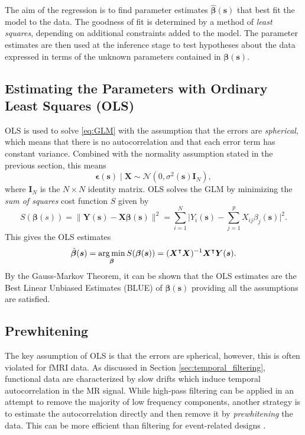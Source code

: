The aim of the regression is to find parameter estimates $\bm{\hat{\beta}}(\bm{s})$ that best fit the model to the data. The goodness of fit is determined by a method of \textit{least squares}, depending on additional constraints added to the model. The parameter estimates are then used at the inference stage to test hypotheses about the data expressed in terms of the unknown parameters contained in $\bm{\beta}(\bm{s})$.

\subsection{Estimating the Parameters with Ordinary Least Squares (OLS)} 
\label{sec:OLS}

OLS is used to solve \ref{eq:GLM} with the assumption that the errors are \textit{spherical}, which means that there is no autocorrelation and that each error term has constant variance. Combined with the normality assumption stated in the previous section, this means
\begin{equation}
\label{eq:OLS_errors}
\bm{\epsilon}(\bm{s}) \mid \bm{X} \sim  \mathcal{N}(0, \sigma^{2}(\bm{s})\bm{I}_{N}),
\end{equation}
where $\bm{I}_{N}$ is the $N \times N$ identity matrix. OLS solves the GLM by minimizing the \textit{sum of squares} cost function $S$ given by
\begin{equation}
\label{eq:OLS_cost}
S(\bm{\beta}(s))  = \lVert \bm{Y}(\bm{s}) - \bm{X}\bm{\beta}(\bm{s}) \rVert^{2} = \sum_{i = 1}^{N} \lvert Y_i(\bm{s}) - \sum_{j = 1}^{p} X_{ij} \beta_j (\bm{s}) \rvert ^{2}.
\end{equation}
This gives the OLS estimates
\begin{equation}
\label{eq:OLS_estimates}
\hat{\bm{\beta}}(\bm{s}) = \operatorname*{arg\,min}_{\bm{\beta}} S(\bm{\beta}(\bm{s})) = (\bm{X}^{\intercal}\bm{X})^{-1}\bm{X}^{\intercal}\bm{Y}(\bm{s}).
\end{equation}
By the Gauss-Markov Theorem, it can be shown that the OLS estimates are the Best Linear Unbiased Estimates (BLUE) of $\bm{\beta}(\bm{s})$ providing all the assumptions are satisfied. 

\subsection{Prewhitening}
\label{sec:prewhitening}

The key assumption of OLS is that the errors are spherical, however, this is often violated for fMRI data. As discussed in Section \ref{sec:temporal_filtering}, functional data are characterized by slow drifts which induce temporal autocorrelation in the MR signal. While high-pass filtering can be applied in an attempt to remove the majority of low frequency components, another strategy is to estimate the autocorrelation directly and then remove it by \textit{prewhitening} the data. This can be more efficient than filtering for event-related designs \citep{Woolrich2001-tk}.

